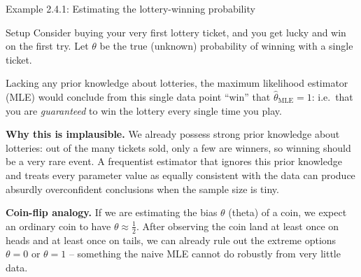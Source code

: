 \documentclass[aspectratio=169,10pt]{beamer}
\begin{document}
\begin{frame}{Example 2.4.1: Estimating the lottery-winning probability}
  \begin{block}{Setup}
    Consider buying your very first lottery ticket, and you get lucky and win
    on the first try. Let $\theta$ be the true (unknown) probability of
    winning with a single ticket.
  \end{block}

  Lacking any prior knowledge about lotteries, the maximum likelihood
  estimator (MLE) would conclude from this single data point ``win'' that
  $\hat\theta_{\mathrm{MLE}}=1$: i.e.\ that you are \emph{guaranteed} to win
  the lottery every single time you play.

  \vspace{0.3cm}
  \textbf{Why this is implausible.} We already possess strong prior knowledge
  about lotteries: out of the many tickets sold, only a few are winners, so
  winning should be a very rare event. A frequentist estimator that ignores
  this prior knowledge and treats every parameter value as equally
  consistent with the data can produce absurdly overconfident conclusions
  when the sample size is tiny.

  \vspace{0.3cm}
  \textbf{Coin-flip analogy.} If we are estimating the bias $\theta$ (theta)
  of a coin, we expect an ordinary coin to have $\theta\approx\frac12$. After
  observing the coin land at least once on heads and at least once on tails,
  we can already rule out the extreme options $\theta=0$ or $\theta=1$ --
  something the naive MLE cannot do robustly from very little data.
\end{frame}
\end{document}
